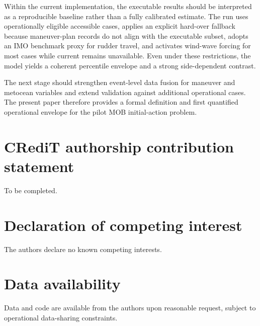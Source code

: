 \documentclass[preprint,12pt]{elsarticle}
\begin{document}
Within the current implementation, the executable results should be interpreted as a reproducible baseline rather than a fully calibrated estimate. The run uses operationally eligible accessible cases, applies an explicit hard-over fallback because maneuver-plan records do not align with the executable subset, adopts an IMO benchmark proxy for rudder travel, and activates wind-wave forcing for most cases while current remains unavailable. Even under these restrictions, the model yields a coherent percentile envelope and a strong side-dependent contrast.

The next stage should strengthen event-level data fusion for maneuver and metocean variables and extend validation against additional operational cases. The present paper therefore provides a formal definition and first quantified operational envelope for the pilot MOB initial-action problem.

\section*{CRediT authorship contribution statement}
To be completed.

\section*{Declaration of competing interest}
The authors declare no known competing interests.

\section*{Data availability}
Data and code are available from the authors upon reasonable request, subject to operational data-sharing constraints.
\end{document}
